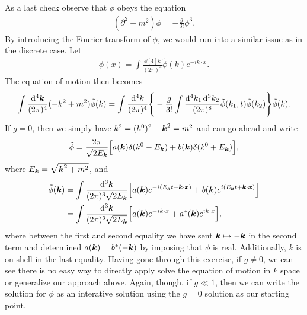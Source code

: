{As a last check observe that $\phi$ obeys the equation
\begin{align}
    ( \partial^2 + m^2 ) \phi = -\frac{g}{3!} \phi^3
.\end{align}
By introducing the Fourier transform of $\phi$, we would run into a similar issue as in the discrete case.
Let
\begin{align}
    \phi(x) = \int \frac{\dd[4]{k}}{(2 \pi)^{4}} \tilde{\phi}(k) e^{-i k \cdot x}
.\end{align}
The equation of motion then becomes 
\begin{align}
    \int \frac{\dd[4]{\vb*{k}}}{(2 \pi)^4} (-k^2 + m^2) \tilde{\phi}(k) = \int \frac{\dd[4]{k}}{(2\pi)^4} \Bigg\{ - \frac{g}{3!} \int \frac{\dd[4]{k_{1}} \dd[3]{k_{2}}}{(2 \pi)^{8}} \tilde{\phi}(k_{1},t) \tilde{\phi}(k_{2}) \Bigg\} \tilde{\phi}(k)
.\end{align}
If $g = 0$, then we simply have $k^2 = (k^{0})^2 - \vb*{k}^2 = m^2$ and can go ahead and write
\begin{align}
    \tilde{\phi} = \frac{2\pi}{\sqrt{2 E_{\vb*{k}}}} \Big[ a(\vb*{k}) \delta(k^{0} - E_{\vb*{k}}) + b(\vb*{k}) \delta(k^{0} + E_{\vb*{k}}) \Big]
,\end{align}
where $E_{\vb*{k}} = \sqrt{\vb*{k}^2 + m^2}$,
and
\begin{align}
    \tilde{\phi}(\vb*{k}) &= \int \frac{\dd[3]{\vb*{k}}}{(2 \pi)^3 \sqrt{2 E_{\vb*{k}}}} \Big[ a(\vb*{k}) e^{-i (E_{\vb*{k}} t - \vb*{k} \cdot \vb*{x})} + b(\vb*{k}) e^{i(E_{\vb*{k}} t + \vb*{k} \cdot \vb*{x})} \Big] \nonumber \\
                          &= \int \frac{\dd[3]{\vb*{k}}}{(2 \pi)^3 \sqrt{2 E_{\vb*{k}}}} \Big[ a(\vb*{k}) e^{-i k \cdot x} + a^{*}(\vb*{k}) e^{i k \cdot x} \Big]
,\end{align}
where between the first and second equality we have sent $\vb*{k} \mapsto -\vb*{k}$ in the second term and determined $a(\vb*{k}) = b^{*}(-\vb*{k})$ by imposing that $\phi$ is real.
Additionally, $k$ is on-shell in the last equality.
Having gone through this exercise, if $g \ne 0$, we can see there is no easy way to directly apply solve the equation of motion in $k$ space or generalize our approach above.
Again, though, if $g \ll 1$, then we can write the solution for $\phi$ as an interative solution using the $g = 0$ solution as our starting point.


}



